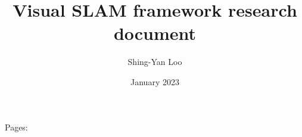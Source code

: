 \documentclass[nobib]{MSword}
\title{Visual SLAM framework research document}
\author{Shing-Yan Loo}
\date{January 2023}
\begin{document}
\maketitle
\begin{center}
    Pages: \pageref{LastPage} %
\end{center}





\end{document}
